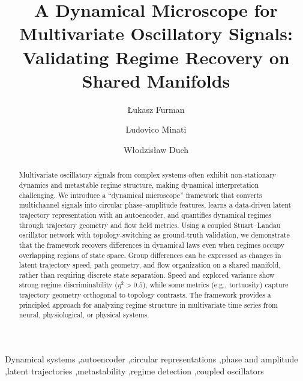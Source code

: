 \documentclass[5p,twocolumn,authoryear]{elsarticle}
\begin{document}
\begin{frontmatter}

\title{A Dynamical Microscope for Multivariate Oscillatory Signals: Validating Regime Recovery on Shared Manifolds}

\author[1]{Łukasz Furman}
\author[2,3]{Ludovico Minati}
\author[1]{Włodzisław Duch}

\address[1]{Faculty of Physics, Astronomy and Informatics, Nicolaus Copernicus University, 87-100, Toruń, Poland}
\address[2]{School of Life Science and Technology, University of Electronic Science and Technology of China, 611731 Chengdu, China}
\address[3]{Center for Mind/Brain Sciences (CIMeC), University of Trento, 38123 Trento, Italy}


\begin{abstract}
Multivariate oscillatory signals from complex systems often exhibit non-stationary dynamics and metastable regime structure, making dynamical interpretation challenging.
We introduce a ``dynamical microscope'' framework that converts multichannel signals into circular phase--amplitude features, learns a data-driven latent trajectory representation with an autoencoder, and quantifies dynamical regimes through trajectory geometry and flow field metrics.
Using a coupled Stuart--Landau oscillator network with topology-switching as ground-truth validation, we demonstrate that the framework recovers differences in dynamical laws even when regimes occupy overlapping regions of state space.
Group differences can be expressed as changes in latent trajectory speed, path geometry, and flow organization on a shared manifold, rather than requiring discrete state separation.
Speed and explored variance show strong regime discriminability ($\eta^2 > 0.5$), while some metrics (e.g., tortuosity) capture trajectory geometry orthogonal to topology contrasts.
The framework provides a principled approach for analyzing regime structure in multivariate time series from neural, physiological, or physical systems.
\end{abstract}

\begin{keyword}
Dynamical systems \sep autoencoder \sep circular representations \sep phase and amplitude \sep latent trajectories \sep metastability \sep regime detection \sep coupled oscillators
\end{keyword}

\end{frontmatter}
\end{document}
